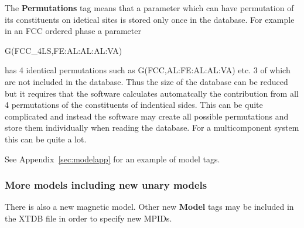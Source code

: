 \documentclass{article}
\begin{document}
The {\bf Permutations} tag means that a parameter which can have
permutation of its constituents on idetical sites is stored only once
in the database.  For example in an FCC ordered phase a parameter

G(FCC\_4LS,FE:AL:AL:AL:VA)

\noindent
has 4 identical permutations such as G(FCC,AL:FE:AL:AL:VA) etc. 3 of
which are not included in the database.  Thus the size of the database
can be reduced but it requires that the software calculates
automatcally the contribution from all 4 permutations of the
constituents of indentical sides.  This can be quite complicated and
instead the software may create all possible permutations and store
them individually when reading the database.  For a multicomponent
system this can be quite a lot.

See Appendix~\ref{sec:modelapp} for an example of model tags.

\newpage 

\subsubsection{More models including new unary models}

There is also a new magnetic model.  Other new {\bf Model} tags
may be included in the XTDB file in order to specify new MPIDs.
\end{document}
